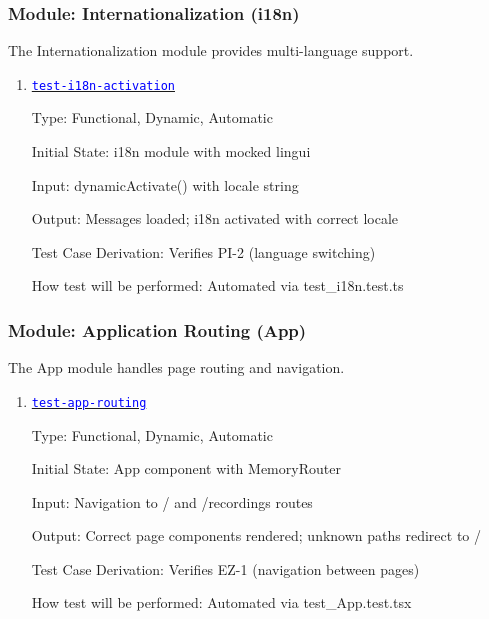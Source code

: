 \documentclass[12pt, titlepage]{article}
\newcommand{\tid}[1]{\hyperlink{tid:#1}{\textcolor{blue}{\texttt{#1}}}}
\begin{document}
\subsubsection{Module: Internationalization (i18n)}

The Internationalization module provides multi-language support.

\begin{enumerate}

  \item{\tid{test-i18n-activation}\\}

        Type: Functional, Dynamic, Automatic

        Initial State: i18n module with mocked lingui

        Input: dynamicActivate() with locale string

        Output: Messages loaded; i18n activated with correct locale

        Test Case Derivation: Verifies PI-2 (language switching)

        How test will be performed: Automated via test\_i18n.test.ts

\end{enumerate}

\subsubsection{Module: Application Routing (App)}

The App module handles page routing and navigation.

\begin{enumerate}

  \item{\tid{test-app-routing}\\}

        Type: Functional, Dynamic, Automatic

        Initial State: App component with MemoryRouter

        Input: Navigation to / and /recordings routes

        Output: Correct page components rendered; unknown paths redirect to /

        Test Case Derivation: Verifies EZ-1 (navigation between pages)

        How test will be performed: Automated via test\_App.test.tsx

\end{enumerate}
\end{document}
